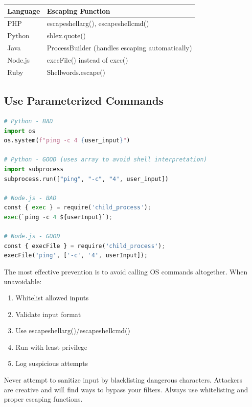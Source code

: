 \documentclass[12pt]{article}
\begin{document}
\begin{longtable}{|l|l|}
\hline
\textbf{Language} & \textbf{Escaping Function} \\
\hline
PHP & escapeshellarg(), escapeshellcmd() \\
\hline
Python & shlex.quote() \\
\hline
Java & ProcessBuilder (handles escaping automatically) \\
\hline
Node.js & execFile() instead of exec() \\
\hline
Ruby & Shellwords.escape() \\
\hline
\end{longtable}

\subsection{Use Parameterized Commands}

\begin{lstlisting}[language=python]
# Python - BAD
import os
os.system(f"ping -c 4 {user_input}")

# Python - GOOD (uses array to avoid shell interpretation)
import subprocess
subprocess.run(["ping", "-c", "4", user_input])

# Node.js - BAD
const { exec } = require('child_process');
exec(`ping -c 4 ${userInput}`);

# Node.js - GOOD
const { execFile } = require('child_process');
execFile('ping', ['-c', '4', userInput]);
\end{lstlisting}

\begin{infobox}
The most effective prevention is to avoid calling OS commands altogether. When unavoidable:
\begin{enumerate}
    \item Whitelist allowed inputs
    \item Validate input format
    \item Use escapeshellarg()/escapeshellcmd()
    \item Run with least privilege
    \item Log suspicious attempts
\end{enumerate}
\end{infobox}

\begin{criticalbox}[Remember]
Never attempt to sanitize input by blacklisting dangerous characters. Attackers are creative and will find ways to bypass your filters. Always use whitelisting and proper escaping functions.
\end{criticalbox}
\end{document}
